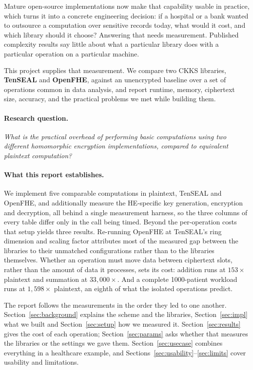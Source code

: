 \documentclass[11pt,a4paper]{article}
\begin{document}
Mature open-source implementations now make that capability usable in practice,
which turns it into a concrete engineering decision: if a hospital or a bank wanted
to outsource a computation over sensitive records today, what would it cost, and
which library should it choose? Answering that needs measurement. Published
complexity results say little about what a particular library does with a particular
operation on a particular machine.

This project supplies that measurement. We compare two CKKS libraries,
\textbf{TenSEAL} and \textbf{OpenFHE}, against an unencrypted baseline over a set of
operations common in data analysis, and report runtime, memory, ciphertext size,
accuracy, and the practical problems we met while building them.

\paragraph{Research question.} \emph{What is the practical overhead of performing
basic computations using two different homomorphic encryption implementations,
compared to equivalent plaintext computation?}

\paragraph{What this report establishes.} We implement five comparable computations
in plaintext, TenSEAL and OpenFHE, and additionally measure the HE-specific key
generation, encryption and decryption, all behind a single measurement harness, so
the three columns of every table differ only in the call being timed. Beyond the
per-operation costs that setup yields three results. Re-running OpenFHE at TenSEAL's
ring dimension and scaling factor attributes most of the measured gap between the
libraries to their unmatched configurations rather than to the libraries themselves.
Whether an operation must move data between ciphertext slots, rather than the amount
of data it processes, sets its cost: addition runs at $153\times$ plaintext and
summation at $33{,}000\times$. And a complete 1000-patient workload runs at
$1{,}598\times$ plaintext, an eighth of what the isolated operations predict.

The report follows the measurements in the order they led to one another.
Section~\ref{sec:background} explains the scheme and the libraries,
Section~\ref{sec:impl} what we built and Section~\ref{sec:setup} how we measured it.
Section~\ref{sec:results} gives the cost of each operation;
Section~\ref{sec:params} asks whether that measures the libraries or the settings we
gave them. Section~\ref{sec:usecase} combines everything in a healthcare example, and
Sections~\ref{sec:usability}--\ref{sec:limits} cover usability and limitations.
\end{document}
